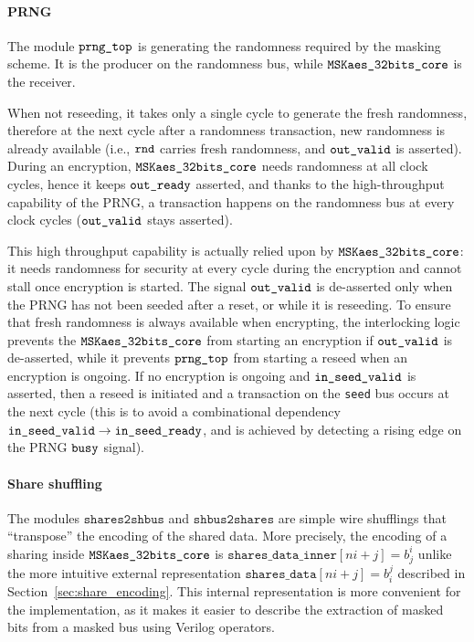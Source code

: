 \documentclass{scrartcl}
\begin{document}
\paragraph{PRNG}
The module $\texttt{prng\_top}$ is generating the randomness required by the 
masking scheme. It is the producer on the randomness bus, while $\texttt{MSKaes\_32bits\_core}$ is
the receiver.

When not reseeding, it takes only a single cycle to generate the fresh randomness, therefore
at the next cycle after a randomness transaction, new randomness is already available (i.e.,
$\texttt{rnd}$ carries fresh randomness, and $\texttt{out\_valid}$ is asserted).
During an encryption, $\texttt{MSKaes\_32bits\_core}$ needs randomness at all clock cycles, hence
it keeps $\texttt{out\_ready}$ asserted, and thanks to the high-throughput
capability of the PRNG, a transaction happens on the randomness bus at every
clock cycles ($\texttt{out\_valid}$ stays asserted).

This high throughput capability is actually relied upon by $\texttt{MSKaes\_32bits\_core}$: it
needs randomness for security at every cycle during the encryption
and cannot stall once encryption is started.
The signal $\texttt{out\_valid}$ is de-asserted only when the PRNG has not been
seeded after a reset, or while it is reseeding.
To ensure that fresh randomness is always available when encrypting, the
interlocking logic prevents the $\texttt{MSKaes\_32bits\_core}$ from starting an encryption if
$\texttt{out\_valid}$ is de-asserted, while it prevents $\texttt{prng\_top}$ from
starting a reseed when an encryption is ongoing.
If no encryption is ongoing and $\texttt{in\_seed\_valid}$ is asserted, then a reseed is
initiated and a transaction on the \texttt{seed} bus occurs at the next cycle
(this is to avoid a combinational dependency $\texttt{in\_seed\_valid} \rightarrow
\texttt{in\_seed\_ready}$, and is achieved by detecting a rising edge on the PRNG
$\texttt{busy}$ signal).

\paragraph{Share shuffling}
The modules $\texttt{shares2shbus}$ and $\texttt{shbus2shares}$ are simple wire
shufflings that ``transpose'' the encoding of the shared data.
More precisely, the encoding of a sharing inside $\texttt{MSKaes\_32bits\_core}$
is $\texttt{shares\_data\_inner}\left[ ni+j\right] = b_j^i$ unlike the more
intuitive external representation $\texttt{shares\_data}\left[ ni+j\right] =
b_i^j$ described in Section~\ref{sec:share_encoding}.
This internal representation is more convenient for the implementation, as it
makes it easier to describe the extraction of masked bits from a masked bus
using Verilog operators.
\end{document}
